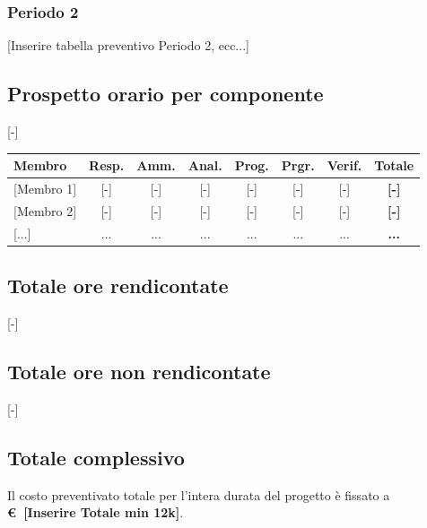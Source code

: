 \subsubsection{Periodo 2}
{[Inserire tabella preventivo Periodo 2, ecc...]}

\vspace{1cm}
\subsection{Prospetto orario per componente}
[-]

\begin{table}[ht]
	\centering
	\renewcommand{\arraystretch}{1.3}
	\begin{tabularx}{\textwidth}{X c c c c c c | c}
		\toprule
		\textbf{Membro} & \textbf{Resp.} & \textbf{Amm.} & \textbf{Anal.} & \textbf{Prog.} & \textbf{Prgr.} & \textbf{Verif.} & \textbf{Totale} \\
		\midrule
		{[Membro 1]} & [-] & [-] & [-] & [-] & [-] & [-] & \textbf{[-]} \\
		{[Membro 2]} & [-] & [-] & [-] & [-] & [-] & [-] & \textbf{[-]} \\
		{[...]} & ... & ... & ... & ... & ... & ... & \textbf{...} \\
		\bottomrule
	\end{tabularx}
\end{table}

\subsection{Totale ore rendicontate}
{[-]}

\subsection{Totale ore non rendicontate}
{[-]}

\subsection{Totale complessivo}
Il costo preventivato totale per l'intera durata del progetto è fissato a \textbf{\euro\ {[Inserire Totale min 12k]}}.